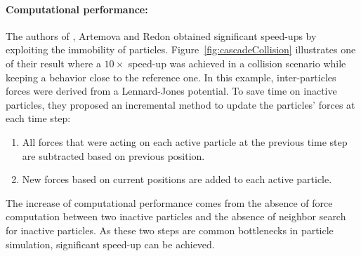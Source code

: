 \paragraph*{Computational performance:}
The authors of \cite{Artemova2012}, Artemova and Redon obtained significant speed-ups by exploiting the immobility of particles. Figure~\ref{fig:cascadeCollision} illustrates one of their result where a $10\times$ speed-up was achieved in a collision scenario while keeping a behavior close to the reference one. In this example, inter-particles forces were derived from a Lennard-Jones potential. To save time on inactive particles, they proposed an incremental method to update the particles' forces at each time step:
\begin{enumerate}
    \item All forces that were acting on each active particle at the previous time step are subtracted based on previous position.
    \item New forces based on current positions are added to each active particle.
\end{enumerate}
The increase of computational performance comes from the absence of force computation between
two inactive particles and the absence of neighbor search for inactive particles.
As these two steps are common bottlenecks in particle simulation, significant speed-up can be achieved.

